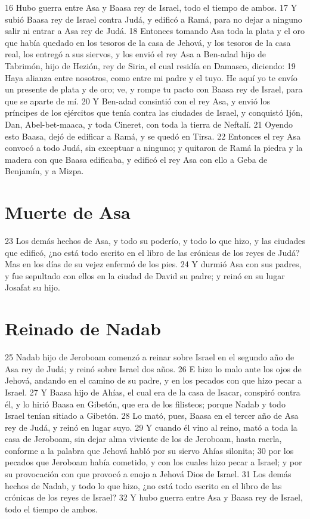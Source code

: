  
16 Hubo guerra entre Asa y Baasa rey de Israel, todo el tiempo de ambos.
17 Y subió Baasa rey de Israel contra Judá, y edificó a Ramá, para no dejar a ninguno salir ni entrar a Asa rey de Judá.
18 Entonces tomando Asa toda la plata y el oro que había quedado en los tesoros de la casa de Jehová, y los tesoros de la casa real, los entregó a sus siervos, y los envió el rey Asa a Ben-adad hijo de Tabrimón, hijo de Hezión, rey de Siria, el cual residía en Damasco, diciendo:
19 Haya alianza entre nosotros, como entre mi padre y el tuyo. He aquí yo te envío un presente de plata y de oro; ve, y rompe tu pacto con Baasa rey de Israel, para que se aparte de mí.
20 Y Ben-adad consintió con el rey Asa, y envió los príncipes de los ejércitos que tenía contra las ciudades de Israel, y conquistó Ijón, Dan, Abel-bet-maaca, y toda Cineret, con toda la tierra de Neftalí.
21 Oyendo esto Baasa, dejó de edificar a Ramá, y se quedó en Tirsa.
22 Entonces el rey Asa convocó a todo Judá, sin exceptuar a ninguno; y quitaron de Ramá la piedra y la madera con que Baasa edificaba, y edificó el rey Asa con ello a Geba de Benjamín, y a Mizpa.
\section*{Muerte de Asa}

 
23 Los demás hechos de Asa, y todo su poderío, y todo lo que hizo, y las ciudades que edificó, ¿no está todo escrito en el libro de las crónicas de los reyes de Judá? Mas en los días de su vejez enfermó de los pies.
24 Y durmió Asa con sus padres, y fue sepultado con ellos en la ciudad de David su padre; y reinó en su lugar Josafat su hijo.
\section*{Reinado de Nadab}

25 Nadab hijo de Jeroboam comenzó a reinar sobre Israel en el segundo año de Asa rey de Judá; y reinó sobre Israel dos años.
26 E hizo lo malo ante los ojos de Jehová, andando en el camino de su padre, y en los pecados con que hizo pecar a Israel.
27 Y Baasa hijo de Ahías, el cual era de la casa de Isacar, conspiró contra él, y lo hirió Baasa en Gibetón, que era de los filisteos; porque Nadab y todo Israel tenían sitiado a Gibetón.
28 Lo mató, pues, Baasa en el tercer año de Asa rey de Judá, y reinó en lugar suyo.
29 Y cuando él vino al reino, mató a toda la casa de Jeroboam, sin dejar alma viviente de los de Jeroboam, hasta raerla, conforme a la palabra que Jehová habló por su siervo Ahías silonita; 
30 por los pecados que Jeroboam había cometido, y con los cuales hizo pecar a Israel; y por su provocación con que provocó a enojo a Jehová Dios de Israel.
31 Los demás hechos de Nadab, y todo lo que hizo, ¿no está todo escrito en el libro de las crónicas de los reyes de Israel?
32 Y hubo guerra entre Asa y Baasa rey de Israel, todo el tiempo de ambos.
